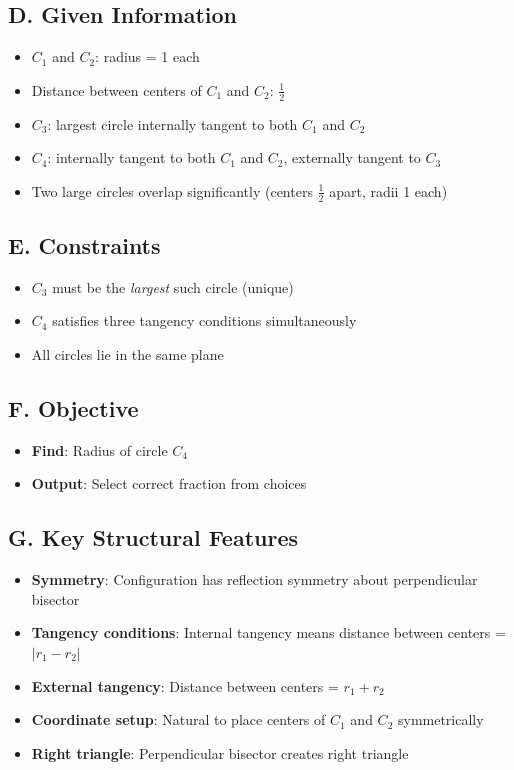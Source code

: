 \documentclass[11pt]{article}
\begin{document}
\begin{problembox}
\subsection*{D. Given Information}
\begin{itemize}[leftmargin=*]
    \item $C_1$ and $C_2$: radius = 1 each
    \item Distance between centers of $C_1$ and $C_2$: $\frac{1}{2}$
    \item $C_3$: largest circle internally tangent to both $C_1$ and $C_2$
    \item $C_4$: internally tangent to both $C_1$ and $C_2$, externally tangent to $C_3$
    \item Two large circles overlap significantly (centers $\frac{1}{2}$ apart, radii 1 each)
\end{itemize}

\subsection*{E. Constraints}
\begin{itemize}[leftmargin=*]
    \item $C_3$ must be the \textit{largest} such circle (unique)
    \item $C_4$ satisfies three tangency conditions simultaneously
    \item All circles lie in the same plane
\end{itemize}

\subsection*{F. Objective}
\begin{itemize}[leftmargin=*]
    \item \textbf{Find}: Radius of circle $C_4$
    \item \textbf{Output}: Select correct fraction from choices
\end{itemize}

\subsection*{G. Key Structural Features}
\begin{itemize}[leftmargin=*]
    \item \textbf{Symmetry}: Configuration has reflection symmetry about perpendicular bisector
    \item \textbf{Tangency conditions}: Internal tangency means distance between centers = $|r_1 - r_2|$
    \item \textbf{External tangency}: Distance between centers = $r_1 + r_2$
    \item \textbf{Coordinate setup}: Natural to place centers of $C_1$ and $C_2$ symmetrically
    \item \textbf{Right triangle}: Perpendicular bisector creates right triangle
\end{itemize}


\end{problembox}
\end{document}
